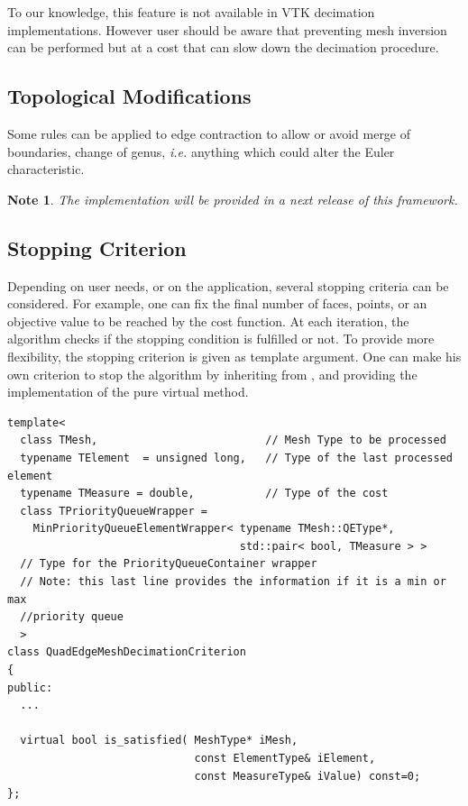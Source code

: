 \documentclass{InsightArticle}
\theoremstyle{plain}
\newtheorem*{note}{Note}
\def \ie {\textit{i.e. }}
\begin{document}
To our knowledge, this feature is not available in VTK decimation implementations. However user should be aware that preventing mesh inversion can be performed but at a cost that can slow down the decimation procedure.

\subsection{Topological Modifications}
Some rules can be applied to edge contraction to allow or avoid merge of boundaries, change of genus, \ie anything which could alter the Euler characteristic.

\begin{note}
 The implementation will be provided in a next release of this framework.
\end{note}


\subsection{Stopping Criterion}
Depending on user needs, or on the application, several stopping criteria can be considered. For example, one can fix the final number of faces, points, or an objective value to be reached by the cost function. At each iteration, the algorithm checks if the stopping condition is fulfilled or not. To provide more flexibility, the stopping criterion is given as template argument. One can make his own criterion to stop the algorithm by inheriting from , and providing the implementation of the pure virtual method.

\begin{verbatim}
template<
  class TMesh,                          // Mesh Type to be processed
  typename TElement  = unsigned long,   // Type of the last processed element
  typename TMeasure = double,           // Type of the cost
  class TPriorityQueueWrapper =
    MinPriorityQueueElementWrapper< typename TMesh::QEType*,
                                    std::pair< bool, TMeasure > >
  // Type for the PriorityQueueContainer wrapper
  // Note: this last line provides the information if it is a min or max
  //priority queue
  >
class QuadEdgeMeshDecimationCriterion
{
public:
  ...

  virtual bool is_satisfied( MeshType* iMesh,
                             const ElementType& iElement,
                             const MeasureType& iValue) const=0;
};
\end{verbatim}
\end{document}
